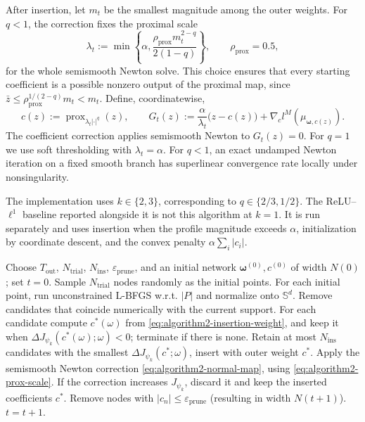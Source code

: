 \documentclass[11pt]{amsart}
\theoremstyle{definition}
\theoremstyle{remark}
\DeclareMathOperator{\prox}{prox}
\begin{document}
After insertion, let $m_t$ be the smallest magnitude among the outer
weights. For $q<1$, the correction fixes the proximal scale
\begin{equation}
\label{eq:algorithm2-prox-scale}
	\lambda_t
	:=\min\left\{\alpha,
	\frac{\rho_{\mathrm{prox}}m_t^{2-q}}{2(1-q)}\right\},
	\qquad \rho_{\mathrm{prox}}=0.5,
\end{equation}
for the whole semismooth Newton solve. This choice ensures that every starting
coefficient is a possible nonzero output of the proximal map, since
$\bar z\le\rho_{\mathrm{prox}}^{1/(2-q)}m_t<m_t$. Define, coordinatewise,
\begin{equation}
\label{eq:algorithm2-normal-map}
	c(z):=\prox_{\lambda_t|\cdot|^q}(z),
	\qquad
	G_t(z):=\frac{\alpha}{\lambda_t}\bigl(z-c(z)\bigr)
	+\nabla_c l^M(\mu_{\boldsymbol\omega,c(z)}).
\end{equation}
The coefficient correction applies semismooth Newton to $G_t(z)=0$. For
$q=1$ we use soft thresholding with $\lambda_t=\alpha$. For $q<1$, an exact
undamped Newton iteration on a fixed smooth branch has superlinear convergence rate locally
under nonsingularity.

The implementation uses $k\in\{2,3\}$, corresponding to
$q\in\{2/3,1/2\}$. The ReLU--$\ell^1$ baseline reported alongside it is not this
algorithm at $k=1$. It is run separately and uses insertion when the profile
magnitude exceeds $\alpha$, initialization by coordinate descent, and the convex
penalty $\alpha\sum_i|c_i|$.

\begin{algorithm}[htbp]
\caption{Iterative node insertion for $J_{\psi_k}$}
\label{alg:q}
\begin{algorithmic}[1]
\State Choose $T_{\mathrm{out}}$, $N_{\mathrm{trial}}$, $N_{\mathrm{ins}}$,
$\varepsilon_{\mathrm{prune}}$, and an initial network
$\boldsymbol\omega^{(0)},c^{(0)}$ of width $N(0)$; set $t=0$.
\State Sample $N_{\mathrm{trial}}$ nodes randomly as the initial points.
\State For each initial point, run unconstrained L-BFGS w.r.t. $|P|$ and
normalize onto $\mathbb S^d$.
\State Remove candidates that coincide numerically with the current support.
\State For each candidate compute $c^*(\omega)$ from
\eqref{eq:algorithm2-insertion-weight}, and keep it when
$\Delta J_{\psi_k}(c^*(\omega);\omega)<0$; terminate if there is none.
\State Retain at most $N_{\mathrm{ins}}$ candidates with the smallest
$\Delta J_{\psi_k}(c^*;\omega)$, insert with outer weight $c^*$.
\State Apply the semismooth Newton correction
\eqref{eq:algorithm2-normal-map}, using
\eqref{eq:algorithm2-prox-scale}. If the correction increases
$J_{\psi_k}$, discard it and keep the inserted coefficients $c^*$.
\State Remove nodes with $|c_n|\le\varepsilon_{\mathrm{prune}}$ (resulting in
width $N(t+1)$).
\State $t = t + 1$.
\EndWhile
\end{algorithmic}
\end{algorithm}
\end{document}

